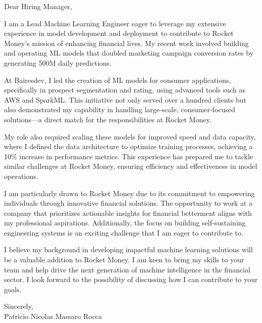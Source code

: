 \documentclass{article}
\begin{document}
\noindent Dear Hiring Manager,


I am a Lead Machine Learning Engineer eager to leverage my extensive experience in model development and deployment to contribute to Rocket Money's mission of enhancing financial lives. My recent work involved building and operating ML models that doubled marketing campaign conversion rates by generating 500M daily predictions.


At Bairesdev, I led the creation of ML models for consumer applications, specifically in prospect segmentation and rating, using advanced tools such as AWS and SparkML. This initiative not only served over a hundred clients but also demonstrated my capability in handling large-scale, consumer-focused solutions—a direct match for the responsibilities at Rocket Money.


My role also required scaling these models for improved speed and data capacity, where I defined the data architecture to optimize training processes, achieving a 10\% increase in performance metrics. This experience has prepared me to tackle similar challenges at Rocket Money, ensuring efficiency and effectiveness in model operations.


I am particularly drawn to Rocket Money due to its commitment to empowering individuals through innovative financial solutions. The opportunity to work at a company that prioritizes actionable insights for financial betterment aligns with my professional aspirations. Additionally, the focus on building self-sustaining engineering systems is an exciting challenge that I am eager to contribute to.


I believe my background in developing impactful machine learning solutions will be a valuable addition to Rocket Money. I am keen to bring my skills to your team and help drive the next generation of machine intelligence in the financial sector. I look forward to the possibility of discussing how I can contribute to your goals.

\vspace{1cm}
\setlength{\parskip}{0em}
\begin{flushright}
Sincerely,\\
Patricio Nicolas Massaro Rocca
\end{flushright}
\end{document}
